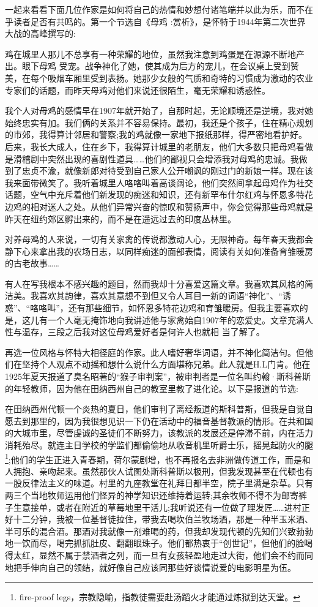 一起来看看下面几位作家是如何将自己的热情和妙想付诸笔端并以此为乐，而不在乎读者足否有共鸣的。第一个节选自《母鸡 :赏析》，是怀特于1944年第二次世界大战的高峰撰写的:

鸡在城里人那儿不总享有一种荣耀的地位，虽然我注意到鸡蛋是在源源不断地产出。眼下母鸡 受宠。战争神化了她，使其成为后方的宠儿，在会议桌上受到赞美，在每个吸烟车厢里受到表扬。她那少女般的气质和奇特的习惯成为激动的农业专家们的话题，而昨天母鸡对他们来说还很陌生，毫无荣耀和诱惑性。

我个人对母鸡的感情早在1907年就开始了，自那时起，无论顺境还是逆境，我对她始终忠实有加。我们俩的关系并不容易保持。最初，我还是个孩子，住在精心规划的市郊，我得算计邻居和警察;我的鸡就像一家地下报纸那样，得严密地看护好。后来，我长大成人，住在乡下，我得算计城里的老朋友，他们大多数只把母鸡看做是滑稽剧中突然出现的喜剧性道具……他们的鄙视只会增添我对母鸡的忠诚。我做到了忠贞不渝，就像新郎对待受到自己家人公开嘲讽的刚过门的新娘一样。现在该我来面带微笑了。我听着城里人咯咯叫着高谈阔论，他们突然间拿起母鸡作为社交话题，空气中充斥着他们新发现的痴迷和知识，还有新罕布什尔红鸡与怀恩多特花边鸡的相对迷人之处。从他们异常兴奋的惊叹和赞扬声中，你会觉得那些母鸡就是昨天在纽约郊区孵出来的，而不是在遥远过去的印度丛林里。

对养母鸡的人来说，一切有关家禽的传说都激动人心，无限神奇。每年春天我都会静下心来拿出我的农场日志，以同样痴迷的面部表情，阅读有关如何准备育雏暖房的古老故事……

有人在写我根本不感兴趣的题目，然而我却十分喜爱这篇文章。我喜欢其风格的简洁美。我喜欢其韵律，喜欢其意想不到但又令人耳目一新的词语“神化”、“诱惑”、“咯咯叫”，还有那些细节，如怀恩多特花边鸡和育雏暖房。但我主要喜欢的是，这儿有一个人毫无掩饰地向我讲述他与家禽始自1907年的恋爱史。文章充满人性与温存，三段之后我对这位母鸡爱好者是何许人也就相 当了解了。

再选一位风格与怀特大相径庭的作家。此人嗜好奢华词语，并不神化简洁句。但他们在坚持个人观点不动摇和想什么说什么方面堪称兄弟。此人就是H.L门肯。他在1925年夏天报道了臭名昭著的“猴子审判案”，被审判者是一位名叫约翰·斯科普斯的年轻教师，因为他在田纳西州自己的教室里教了进化论。以下是报道的节选:

在田纳西州代顿一个炎热的夏日，他们审判了离经叛道的斯科普斯，但我是自觉自愿去到那里的，因为我很想见识一下仍在活动中的福音基督教派的情形。在共和国的大城市里，尽管虔诚的圣徒们不断努力，该教派的发展还是停滞不前，内在活力消耗殆尽。就连主日学校的学监们都偷偷地从收音机里听爵士乐，摇晃起防火的腿\footnote{fire-proof legs，宗教隐喻，指教徒需要赴汤蹈火才能通过炼狱到达天堂。};他们的学生正进入青春期，荷尔蒙剧增，也不再报名去非洲做传道工作，而是和人拥抱、亲吻起来。虽然那伙人试图处斯科普斯以极刑，但我发现甚至在代顿也有一股反律法主义的味道。村里的九座教堂在礼拜日都半空，院子里满是杂草。只有两三个当地牧师运用他们怪异的神学知识还维持着运转;其余牧师不得不为邮寄裤子生意接单，或者在附近的草莓地里干活儿;我听说还有一位做了理发匠……进村正好十二分钟，我被一位基督徒拉住，带我去喝坎伯兰牧场酒，那是一种半玉米酒、半可乐的混合酒。那酒对我就像一剂难喝的药，但我却发现代顿的先知们兴致勃勃地一饮而尽，喝完抓抓肚皮、翻翻眼珠子。他们都热衷于“创世记”，但他们的脸喝得太红，显然不属于禁酒者之列，而一旦有女孩轻盈地走过大街，他们会不约而同地把手伸向自己的领结，就好像自己应该同那些好谈情说爱的电影明星为伍。

